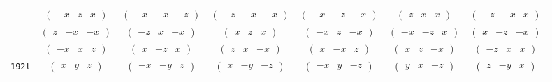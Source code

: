 \documentclass[fleqn,9pt,landscape]{jsarticle}
\begin{document}
\begin{center}
\begin{longtable}{ccccccc}
& $ \begin{pmatrix} - x & z & x \end{pmatrix} $ & $ \begin{pmatrix} - x & - x & - z \end{pmatrix} $ & $ \begin{pmatrix} - z & - x & - x \end{pmatrix} $ & $ \begin{pmatrix} - x & - z & - x \end{pmatrix} $ & $ \begin{pmatrix} z & x & x \end{pmatrix} $ & $ \begin{pmatrix} - z & - x & x \end{pmatrix} $ \\
& $ \begin{pmatrix} z & - x & - x \end{pmatrix} $ & $ \begin{pmatrix} - z & x & - x \end{pmatrix} $ & $ \begin{pmatrix} x & z & x \end{pmatrix} $ & $ \begin{pmatrix} - x & z & - x \end{pmatrix} $ & $ \begin{pmatrix} - x & - z & x \end{pmatrix} $ & $ \begin{pmatrix} x & - z & - x \end{pmatrix} $ \\
& $ \begin{pmatrix} - x & x & z \end{pmatrix} $ & $ \begin{pmatrix} x & - z & x \end{pmatrix} $ & $ \begin{pmatrix} z & x & - x \end{pmatrix} $ & $ \begin{pmatrix} x & - x & z \end{pmatrix} $ & $ \begin{pmatrix} x & z & - x \end{pmatrix} $ & $ \begin{pmatrix} - z & x & x \end{pmatrix} $ \\ \hline
{\tt 192l} & $ \begin{pmatrix} x & y & z \end{pmatrix} $ & $ \begin{pmatrix} - x & - y & z \end{pmatrix} $ & $ \begin{pmatrix} x & - y & - z \end{pmatrix} $ & $ \begin{pmatrix} - x & y & - z \end{pmatrix} $ & $ \begin{pmatrix} y & x & - z \end{pmatrix} $ & $ \begin{pmatrix} z & - y & x \end{pmatrix} $ \\

\end{longtable}
\end{center}
\end{document}
